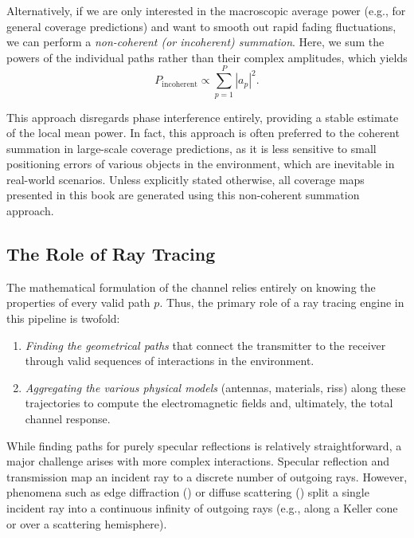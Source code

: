 Alternatively, if we are only interested in the macroscopic average power (e.g., for general coverage predictions) and want to smooth out rapid fading fluctuations, we can perform a \emph{non-coherent (or incoherent) summation}. Here, we sum the powers of the individual paths rather than their complex amplitudes, which yields
\begin{equation}
  P_{\text{incoherent}} \propto \sum_{p=1}^{P} |a_p|^2.
\end{equation}

This approach disregards phase interference entirely, providing a stable estimate of the local mean power. In fact, this approach is often preferred to the coherent summation in large-scale coverage predictions, as it is less sensitive to small positioning errors of various objects in the environment, which are inevitable in real-world scenarios. Unless explicitly stated otherwise, all coverage maps presented in this book are generated using this non-coherent summation approach.

\subsection{The Role of Ray Tracing}

The mathematical formulation of the channel relies entirely on knowing the properties of every valid path $p$. Thus, the primary role of a ray tracing engine in this pipeline is twofold:
\begin{enumerate}
  \item \emph{Finding the geometrical paths} that connect the transmitter to the receiver through valid sequences of interactions in the environment.
  \item \emph{Aggregating the various physical models} (antennas, materials, \glspl{ris}) along these trajectories to compute the electromagnetic fields and, ultimately, the total channel response.
\end{enumerate}

While finding paths for purely specular reflections is relatively straightforward, a major challenge arises with more complex interactions. Specular reflection and transmission map an incident ray to a discrete number of outgoing rays. However, phenomena such as edge diffraction () or diffuse scattering () split a single incident ray into a continuous infinity of outgoing rays (e.g., along a Keller cone or over a scattering hemisphere).

